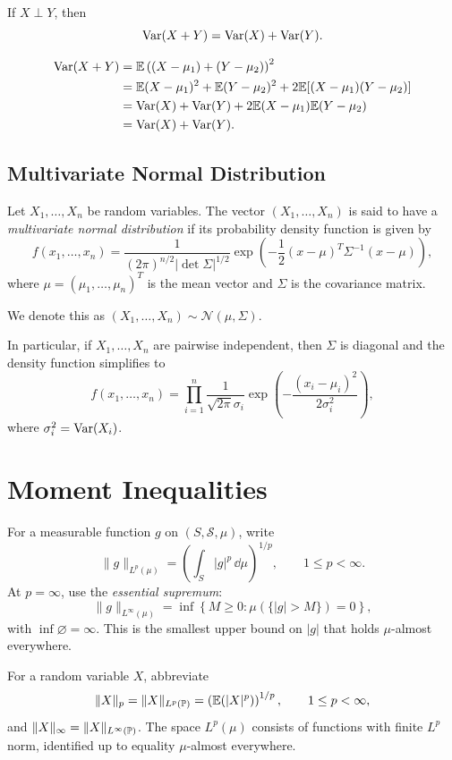 \begin{propositionbox}
    If $X \perp Y$, then
    $$\operatorname{\mathrm{Var}}(X + Y) = \operatorname{\mathrm{Var}}(X) + \operatorname{\mathrm{Var}}(Y).$$
\end{propositionbox}
\begin{proofbox}
    $$\begin{aligned}
        \operatorname{\mathrm{Var}}(X + Y) &= \mathbb{E}\left((X - \mu_1) + (Y - \mu_2)\right)^2 \\
        & = \mathbb{E}(X - \mu_1)^2 + \mathbb{E}(Y - \mu_2)^2 + 2\mathbb{E}[(X - \mu_1)(Y - \mu_2)] \\
        & = \operatorname{\mathrm{Var}}(X) + \operatorname{\mathrm{Var}}(Y) + 2\mathbb{E}(X - \mu_1)\mathbb{E}(Y - \mu_2)\\
        & = \operatorname{\mathrm{Var}}(X) + \operatorname{\mathrm{Var}}(Y).
    \end{aligned}$$
\end{proofbox}

\subsection{Multivariate Normal Distribution}

\begin{definitionbox}
    Let $X_1, \ldots, X_n$ be random variables. The vector
    $(X_1, \ldots, X_n)$ is said to have a \emph{multivariate normal
    distribution} if its probability density function is given by
    $$f(x_1, \ldots, x_n) = \frac{1}{(2\pi)^{n/2}|\det \Sigma|^{1/2}} \exp\left(-\frac{1}{2}(x - \mu)^T \Sigma^{-1} (x - \mu)\right),$$
    where $\mu = (\mu_1, \ldots, \mu_n)^T$ is the mean vector and $\Sigma$ is the covariance matrix.

    We denote this as $(X_1, \ldots, X_n) \sim \mathcal{N}(\mu, \Sigma)$.

    In particular, if $X_1, \ldots, X_n$ are pairwise independent, then
    $\Sigma$ is diagonal and the density function simplifies to
    $$f(x_1, \ldots, x_n) = \prod_{i=1}^{n} \frac{1}{\sqrt{2\pi}\sigma_i} \exp\left(-\frac{(x_i - \mu_i)^2}{2\sigma_i^2}\right),$$
    where $\sigma_i^2 = \operatorname{\mathrm{Var}}(X_i)$.
\end{definitionbox}

\section{Moment Inequalities}

\begin{definitionbox}[$L^p$ norms]
    For a measurable function $g$ on $(S,\mathcal{S},\mu)$, write
    $$\|g\|_{L^p(\mu)}
    =\left(\int_S |g|^p\,\dd\mu\right)^{1/p},
    \qquad 1\leq p<\infty.$$
    At $p=\infty$, use the \emph{essential supremum}:
    $$\|g\|_{L^\infty(\mu)}
    =\inf\left\{M\geq0:\mu(\{|g|>M\})=0\right\},$$
    with $\inf\varnothing=\infty$. This is the smallest upper bound
    on $|g|$ that holds $\mu$-almost everywhere.

    For a random variable $X$, abbreviate
    $$\|X\|_p=\|X\|_{L^p(\mathbb{P})}
    =\left(\mathbb{E}(|X|^p)\right)^{1/p},\qquad 1\leq p<\infty,$$
    and $\|X\|_\infty=\|X\|_{L^\infty(\mathbb{P})}$.
    The space $L^p(\mu)$ consists of functions with finite $L^p$ norm,
    identified up to equality $\mu$-almost everywhere.
\end{definitionbox}

